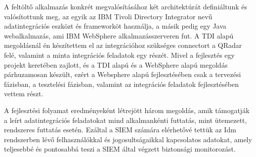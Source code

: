 A feltöltő alkalmazás konkrét megvalósításához két architektúrát definiáltunk és valósítottunk meg, az egyik az IBM Tivoli Directory Integrator nevű adatintegrációs eszközt és frameworköt használja, a másik pedig egy Java webalkalmazás, ami IBM WebSphere alkalmazásszerveren fut. A TDI alapú megoldásnál én készítettem el az integrációhoz szükséges connectort a QRadar felé, valamint a minta integrációs feladatok egy részét.  Mivel a fejlesztés egy projekt keretében zajlott, és a TDI alapú és a WebSphere alapú megoldás párhuzamosan készült, ezért a Websphere alapú fejlesztésében csak a tervezési fázisban, a tesztelési fázisban, valamint az integrációs feladatok fejlesztésében vettem részt.

A fejlesztési folyamat eredményeként létrejött három megoldás, amik támogatják a leírt adatintegrációs feladatokat mind alkalmankénti futtatás, mint ütemezett, rendszeres futtatás esetén. Ezáltal a SIEM számára elérhetővé tettük az Idm rendszerben lévő felhasználókkal és jogosultságaikkal kapcsolatos adatokat, amely teljesebbé és pontosabbá teszi a SIEM által végzett biztonsági monitorozást.

